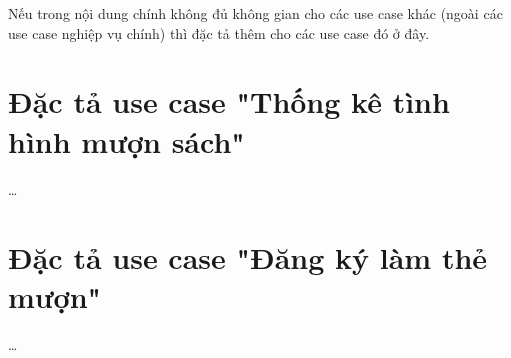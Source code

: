 \documentclass[../main.tex]{subfiles}
\begin{document}
Nếu trong nội dung chính không đủ không gian cho các use case khác (ngoài các use case nghiệp vụ chính) thì đặc tả thêm cho các use case đó ở đây.

\section{Đặc tả use case "Thống kê tình hình mượn sách"}
\ldots

\section{Đặc tả use case "Đăng ký làm thẻ mượn"}
\ldots
\end{document}
